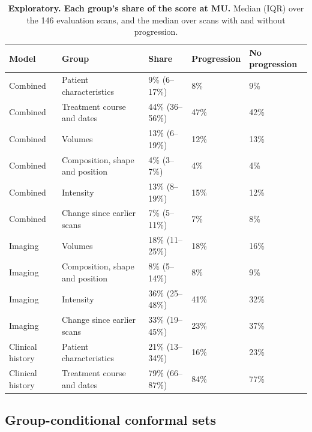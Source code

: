\documentclass[11pt,a4paper]{article}
\begin{document}
\begin{table}[!htbp]
\renewcommand{\thetable}{S11}\renewcommand{\theHtable}{S11}
\centering
\caption{\textbf{Exploratory. Each group's share of the score at MU.} Median (IQR) over the 146 evaluation scans, and
the median over scans with and without progression.}
\label{tab:S26e}
\footnotesize
\begin{tabularx}{\linewidth}{@{}R{2.4cm}LR{2.4cm}R{1.8cm}R{1.8cm}@{}}
\toprule
Model & Group & Share & Progression & No progression \\
\midrule
Combined & Patient characteristics & 9\% (6--17\%) & 8\% & 9\% \\
Combined & Treatment course and dates & 44\% (36--56\%) & 47\% & 42\% \\
Combined & Volumes & 13\% (6--19\%) & 12\% & 13\% \\
Combined & Composition, shape and position & 4\% (3--7\%) & 4\% & 4\% \\
Combined & Intensity & 13\% (8--19\%) & 15\% & 12\% \\
Combined & Change since earlier scans & 7\% (5--11\%) & 7\% & 8\% \\
\addlinespace
Imaging & Volumes & 18\% (11--25\%) & 18\% & 16\% \\
Imaging & Composition, shape and position & 8\% (5--14\%) & 8\% & 9\% \\
Imaging & Intensity & 36\% (25--48\%) & 41\% & 32\% \\
Imaging & Change since earlier scans & 33\% (19--45\%) & 23\% & 37\% \\
\addlinespace
Clinical history & Patient characteristics & 21\% (13--34\%) & 16\% & 23\% \\
Clinical history & Treatment course and dates & 79\% (66--87\%) & 84\% & 77\% \\
\bottomrule
\end{tabularx}
\end{table}

\subsection{Group-conditional conformal sets}\label{sec:S26.2}
\end{document}
